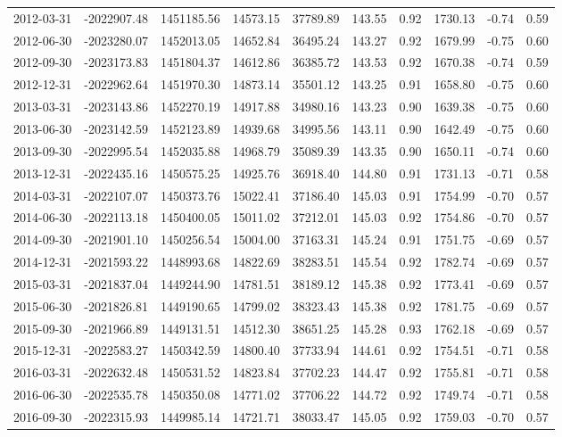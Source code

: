\begin{landscape}
\begin{longtable}{llllllllll}
2012-03-31 & -2022907.48 & 1451185.56 & 14573.15 & 37789.89 & 143.55 & 0.92 & 1730.13 & -0.74 & 0.59 \\
2012-06-30 & -2023280.07 & 1452013.05 & 14652.84 & 36495.24 & 143.27 & 0.92 & 1679.99 & -0.75 & 0.60 \\
2012-09-30 & -2023173.83 & 1451804.37 & 14612.86 & 36385.72 & 143.53 & 0.92 & 1670.38 & -0.74 & 0.59 \\
2012-12-31 & -2022962.64 & 1451970.30 & 14873.14 & 35501.12 & 143.25 & 0.91 & 1658.80 & -0.75 & 0.60 \\
2013-03-31 & -2023143.86 & 1452270.19 & 14917.88 & 34980.16 & 143.23 & 0.90 & 1639.38 & -0.75 & 0.60 \\
2013-06-30 & -2023142.59 & 1452123.89 & 14939.68 & 34995.56 & 143.11 & 0.90 & 1642.49 & -0.75 & 0.60 \\
2013-09-30 & -2022995.54 & 1452035.88 & 14968.79 & 35089.39 & 143.35 & 0.90 & 1650.11 & -0.74 & 0.60 \\
2013-12-31 & -2022435.16 & 1450575.25 & 14925.76 & 36918.40 & 144.80 & 0.91 & 1731.13 & -0.71 & 0.58 \\
2014-03-31 & -2022107.07 & 1450373.76 & 15022.41 & 37186.40 & 145.03 & 0.91 & 1754.99 & -0.70 & 0.57 \\
2014-06-30 & -2022113.18 & 1450400.05 & 15011.02 & 37212.01 & 145.03 & 0.92 & 1754.86 & -0.70 & 0.57 \\
2014-09-30 & -2021901.10 & 1450256.54 & 15004.00 & 37163.31 & 145.24 & 0.91 & 1751.75 & -0.69 & 0.57 \\
2014-12-31 & -2021593.22 & 1448993.68 & 14822.69 & 38283.51 & 145.54 & 0.92 & 1782.74 & -0.69 & 0.57 \\
2015-03-31 & -2021837.04 & 1449244.90 & 14781.51 & 38189.12 & 145.38 & 0.92 & 1773.41 & -0.69 & 0.57 \\
2015-06-30 & -2021826.81 & 1449190.65 & 14799.02 & 38323.43 & 145.38 & 0.92 & 1781.75 & -0.69 & 0.57 \\
2015-09-30 & -2021966.89 & 1449131.51 & 14512.30 & 38651.25 & 145.28 & 0.93 & 1762.18 & -0.69 & 0.57 \\
2015-12-31 & -2022583.27 & 1450342.59 & 14800.40 & 37733.94 & 144.61 & 0.92 & 1754.51 & -0.71 & 0.58 \\
2016-03-31 & -2022632.48 & 1450531.52 & 14823.84 & 37702.23 & 144.47 & 0.92 & 1755.81 & -0.71 & 0.58 \\
2016-06-30 & -2022535.78 & 1450350.08 & 14771.02 & 37706.22 & 144.72 & 0.92 & 1749.74 & -0.71 & 0.58 \\
2016-09-30 & -2022315.93 & 1449985.14 & 14721.71 & 38033.47 & 145.05 & 0.92 & 1759.03 & -0.70 & 0.57 \\

\end{longtable}
\end{landscape}
